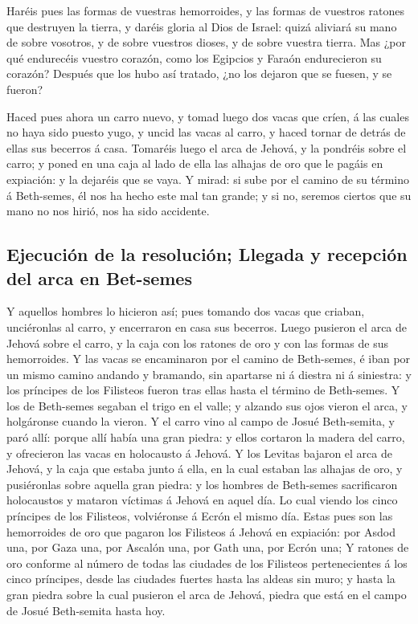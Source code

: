  Haréis pues las formas de vuestras hemorroides, y las
formas de vuestros ratones que destruyen la tierra, y daréis gloria al
Dios de Israel: quizá aliviará su mano de sobre vosotros, y de sobre
vuestros dioses, y de sobre vuestra tierra.  Mas ¿por qué
endurecéis vuestro corazón, como los Egipcios y Faraón endurecieron su
corazón? Después que los hubo así tratado, ¿no los dejaron que se
fuesen, y se fueron?

 Haced pues ahora un carro nuevo, y tomad luego dos vacas
que críen, á las cuales no haya sido puesto yugo, y uncid las vacas al
carro, y haced tornar de detrás de ellas sus becerros á casa.
 Tomaréis luego el arca de Jehová, y la pondréis sobre el
carro; y poned en una caja al lado de ella las alhajas de oro que le
pagáis en expiación: y la dejaréis que se vaya.  Y mirad:
si sube por el camino de su término á Beth-semes, él nos ha hecho este
mal tan grande; y si no, seremos ciertos que su mano no nos hirió, nos
ha sido accidente.

\hypertarget{ejecuciuxf3n-de-la-resoluciuxf3n-llegada-y-recepciuxf3n-del-arca-en-bet-semes}{%
\subsection{Ejecución de la resolución; Llegada y recepción del arca en
Bet-semes}\label{ejecuciuxf3n-de-la-resoluciuxf3n-llegada-y-recepciuxf3n-del-arca-en-bet-semes}}

 Y aquellos hombres lo hicieron así; pues tomando dos
vacas que criaban, unciéronlas al carro, y encerraron en casa sus
becerros.  Luego pusieron el arca de Jehová sobre el
carro, y la caja con los ratones de oro y con las formas de sus
hemorroides.  Y las vacas se encaminaron por el camino de
Beth-semes, é iban por un mismo camino andando y bramando, sin apartarse
ni á diestra ni á siniestra: y los príncipes de los Filisteos fueron
tras ellas hasta el término de Beth-semes.  Y los de
Beth-semes segaban el trigo en el valle; y alzando sus ojos vieron el
arca, y holgáronse cuando la vieron.  Y el carro vino al
campo de Josué Beth-semita, y paró allí: porque allí había una gran
piedra: y ellos cortaron la madera del carro, y ofrecieron las vacas en
holocausto á Jehová.  Y los Levitas bajaron el arca de
Jehová, y la caja que estaba junto á ella, en la cual estaban las
alhajas de oro, y pusiéronlas sobre aquella gran piedra: y los hombres
de Beth-semes sacrificaron holocaustos y mataron víctimas á Jehová en
aquel día.  Lo cual viendo los cinco príncipes de los
Filisteos, volviéronse á Ecrón el mismo día.  Estas pues
son las hemorroides de oro que pagaron los Filisteos á Jehová en
expiación: por Asdod una, por Gaza una, por Ascalón una, por Gath una,
por Ecrón una;  Y ratones de oro conforme al número de
todas las ciudades de los Filisteos pertenecientes á los cinco
príncipes, desde las ciudades fuertes hasta las aldeas sin muro; y hasta
la gran piedra sobre la cual pusieron el arca de Jehová, piedra que está
en el campo de Josué Beth-semita hasta hoy.

